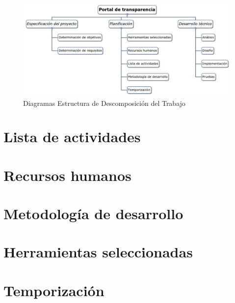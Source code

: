 \begin{figure}[htb]
  \begin{center}
  \includegraphics[width=1\textwidth]{imagenes/edt.png}
  \end{center}
  \caption[EDT]{Diagramas Estructura de Descomposición del Trabajo}
\end{figure}

\section{Lista de actividades}

\section{Recursos humanos}

\section{Metodología de desarrollo}

\section{Herramientas seleccionadas}

\section{Temporización}
